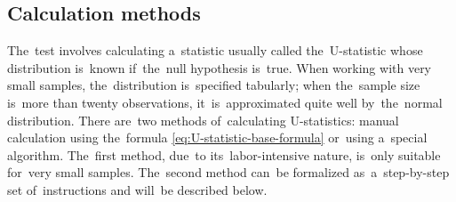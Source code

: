\documentclass[]{scrreprt}
\begin{document}
\subsection{Calculation methods}
The~test involves calculating a~statistic usually called the~U-statistic whose distribution is~known if~the~null hypothesis is~true. When working with very small samples, the~distribution is~specified tabularly; when the~sample size is~more than twenty observations, it~is~approximated quite well by~the~normal distribution. There are~two methods of~calculating U-statistics: manual calculation using the~formula \ref{eq:U-statistic-base-formula} or~using a~special algorithm. The~first method, due~to its~labor-intensive nature, is~only suitable for~very small samples. The~second method can~be formalized as~a~step-by-step set of~instructions and will~be described below.
\end{document}
